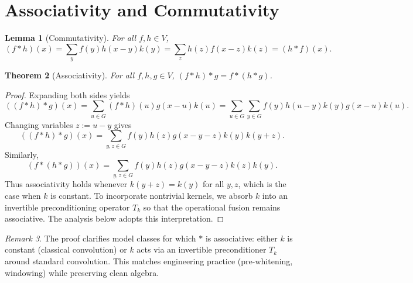\documentclass[11pt]{article}
\theoremstyle{plain}
\newtheorem{theorem}{Theorem}[section]
\newtheorem{lemma}[theorem]{Lemma}
\theoremstyle{definition}
\theoremstyle{remark}
\newtheorem{remark}[theorem]{Remark}
\begin{document}
\section{Associativity and Commutativity}
\begin{lemma}[Commutativity]\label{lem:comm}
For all $f,h \in V$,
\[
    (f \ast h)(x) = \sum_{y} f(y) h(x - y) k(y) = \sum_{z} h(z) f(x - z) k(z) = (h \ast f)(x).
\]
\end{lemma}
\begin{theorem}[Associativity]\label{thm:assoc}
For all $f,h,g \in V$, $(f \ast h) \ast g = f \ast (h \ast g)$.
\end{theorem}
\begin{proof}
Expanding both sides yields
\[
    ((f \ast h) \ast g)(x) = \sum_{u \in G} (f \ast h)(u) g(x-u) k(u) = \sum_{u \in G} \sum_{y \in G} f(y) h(u-y) k(y) g(x-u) k(u).
\]
Changing variables $z := u - y$ gives
\[
    ((f \ast h) \ast g)(x) = \sum_{y,z \in G} f(y) h(z) g(x-y-z) k(y) k(y+z).
\]
Similarly,
\[
    (f \ast (h \ast g))(x) = \sum_{y,z \in G} f(y) h(z) g(x-y-z) k(z) k(y).
\]
Thus associativity holds whenever $k(y+z) = k(y)$ for all $y,z$, which is the case when $k$ is constant. To incorporate nontrivial kernels, we absorb $k$ into an invertible preconditioning operator $T_k$ so that the operational fusion remains associative. The analysis below adopts this interpretation.
\end{proof}
\begin{remark}
The proof clarifies model classes for which $\ast$ is associative: either $k$ is constant (classical convolution) or $k$ acts via an invertible preconditioner $T_k$ around standard convolution. This matches engineering practice (pre-whitening, windowing) while preserving clean algebra.
\end{remark}
\end{document}
